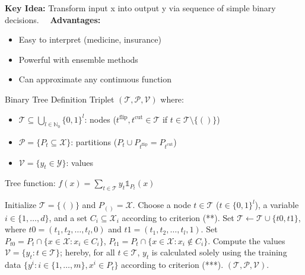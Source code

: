\documentclass[a4paper,10pt]{article}
\newenvironment{myitemize}
{\vspace{-0.25cm}\begin{itemize}}
{\end{itemize}}
\begin{document}
\begin{small}
\textbf{Key Idea:} Transform input x into output y via sequence of simple binary decisions. \ \ \textbf{Advantages:}

\begin{itemize}
    \item Easy to interpret (medicine, insurance)
    \item Powerful with ensemble methods
    \item Can approximate any continuous function
\end{itemize}

\begin{subbox}{Binary Tree Definition}
    Triplet $(\mathcal{T}, \mathcal{P}, \mathcal{V})$ where:
    
\begin{myitemize}
    \item $\mathcal{T} \subseteq \bigcup_{l \in \mathbb{N}_0} \{0, 1\}^l$: nodes ($t^{\text{flip}}, t^{\text{cut}} \in \mathcal{T}$ if $t \in \mathcal{T} \setminus \{()\}$)
    \item $\mathcal{P} = \{P_t \subseteq \mathcal{X}\}$: partitions ($P_t \cup P_{t^{\text{flip}}} = P_{t^{\text{cut}}}$)
    \item $\mathcal{V} = \{y_t \in \mathcal{Y}\}$: values
\end{myitemize}
Tree function: $f(x) = \sum_{t \in \mathcal{T}} y_t \mathds{1}_{P_t}(x)$
\end{subbox} 

\begin{algorithm}[ht!]
\footnotesize
\caption{Basic structure of tree growing algorithm}
\begin{algorithmic}[1]
\State Initialize $\mathcal{T} = \{()\}$ and $P_{()} = \mathcal{X}$.
    \State Choose a node $t \in \mathcal{T}$ ($t \in \{0, 1\}^l$), a variable $i \in \{1, \ldots, d\}$, and a set $C_i \subseteq \mathcal{X}_i$ according to criterion (**).
    \State Set $\mathcal{T} \leftarrow \mathcal{T} \cup \{t0, t1\}$, where $t0 = (t_1, t_2, \ldots, t_l, 0)$ and $t1 = (t_1, t_2, \ldots, t_l, 1)$.
    \State Set $P_{t0} = P_t \cap \{x \in \mathcal{X} : x_i \in C_i\}$, $P_{t1} = P_t \cap \{x \in \mathcal{X} : x_i \not\in C_i\}$.
\EndWhile
\State Compute the values $\mathcal{V} = \{y_t : t \in \mathcal{T}\}$; hereby, for all $t \in \mathcal{T}$, $y_t$ is calculated solely using the training data $\{y^i : i \in \{1, \ldots, m\}, x^i \in P_t\}$ according to criterion (***).
\State \Return $(\mathcal{T}, \mathcal{P}, \mathcal{V})$.
\end{algorithmic}
\end{algorithm}


\end{small}
\end{document}
